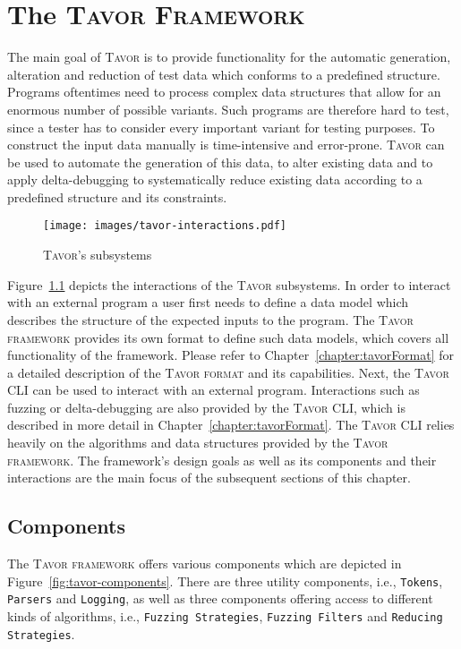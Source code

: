 \chapter{The \textsc{Tavor Framework}}
\label{chapter:tavorFramework}

The main goal of \textsc{Tavor} is to provide functionality for the automatic generation, alteration and reduction of test data which conforms to a predefined structure. Programs oftentimes need to process complex data structures that allow for an enormous number of possible variants. Such programs are therefore hard to test, since a tester has to consider every important variant for testing purposes. To construct the input data manually is time-intensive and error-prone. \textsc{Tavor} can be used to automate the generation of this data, to alter existing data and to apply delta-debugging to systematically reduce existing data according to a predefined structure and its constraints.

\begin{figure}[hb]
\texttt{[image: images/tavor-interactions.pdf]}
\caption{\textsc{Tavor}'s subsystems}
\label{fig:tavor-interactions}
\end{figure}

Figure~\ref{fig:tavor-interactions} depicts the interactions of the \textsc{Tavor} subsystems. In order to interact with an external program a user first needs to define a data model which describes the structure of the expected inputs to the program. The \textsc{Tavor framework} provides its own format to define such data models, which covers all functionality of the framework. Please refer to Chapter~\ref{chapter:tavorFormat} for a detailed description of the \textsc{Tavor format} and its capabilities. Next, the \textsc{Tavor CLI} can be used to interact with an external program. Interactions such as fuzzing or delta-debugging are also provided by the \textsc{Tavor CLI}, which is described in more detail in Chapter~\ref{chapter:tavorFormat}. The \textsc{Tavor CLI} relies heavily on the algorithms and data structures provided by the \textsc{Tavor framework}. The framework's design goals as well as its components and their interactions are the main focus of the subsequent sections of this chapter.

\section{Components}
\label{sec:components}

The \textsc{Tavor framework} offers various components which are depicted in Figure~\ref{fig:tavor-components}. There are three utility components, i.e., \texttt{Tokens}, \texttt{Parsers} and \texttt{Logging}, as well as three components offering access to different kinds of algorithms, i.e., \texttt{Fuzzing Strategies}, \texttt{Fuzzing Filters} and \texttt{Reducing Strategies}.

